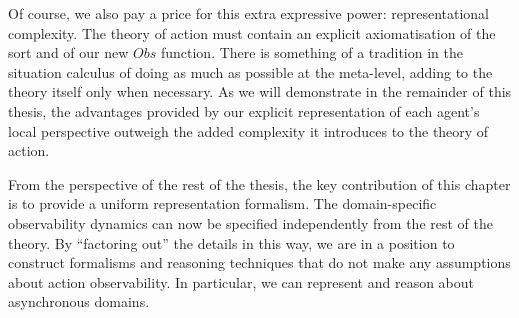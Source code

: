 Of course, we also pay a price for this extra expressive power: representational complexity.
The theory of action must contain an explicit axiomatisation of the
 sort and of our new $Obs$ function. There is something
of a tradition in the situation calculus of doing as much as possible
at the meta-level, adding to the theory itself only when necessary.
As we will demonstrate in the remainder of this thesis, the advantages
provided by our explicit representation of each agent's local perspective
outweigh the added complexity it introduces to the theory of action.

From the perspective of the rest of the thesis, the key contribution
of this chapter is to provide a uniform representation formalism.
The domain-specific observability dynamics can now be specified independently
from the rest of the theory. By {}``factoring out'' the details
in this way, we are in a position to construct formalisms and reasoning
techniques that do not make any assumptions about action observability.
In particular, we can represent and reason about asynchronous domains.

